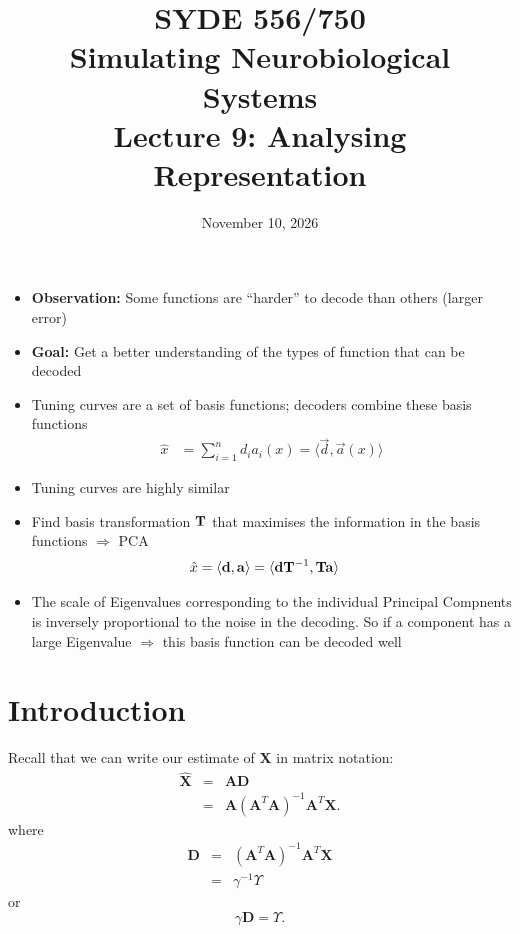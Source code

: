 \documentclass[10pt,letterpaper,oneside]{article}
\date{November 10, 2026}
\title{SYDE 556/750 \\ Simulating Neurobiological Systems \\ Lecture 9: Analysing Representation}
\begin{document}



\begin{itemize}
	\item \textbf{Observation:} Some functions are \enquote{harder} to decode than others (larger error)
	\item \textbf{Goal:} Get a better understanding of the types of function that can be decoded
	\item Tuning curves are a set of basis functions; decoders combine these basis functions
	\begin{align*}
		\hat x &= \sum_{i = 1}^n d_i a_i(x) = \langle \vec d, \vec a(x) \rangle
	\end{align*}
	\item Tuning curves are highly similar
	\item Find basis transformation ${\mathbf{T}}$ that maximises the information in the basis functions $\Rightarrow$ PCA
	\begin{align*}
		\hat x &= \langle {\mathbf{d}}, {\mathbf{a}} \rangle = \langle {\mathbf{d}} {\mathbf{T}}^{-1}, {\mathbf{T}} {\mathbf{a}} \rangle
	\end{align*}
	\item The scale of Eigenvalues corresponding to the individual Principal Compnents is inversely proportional to the noise in the decoding. So if a component has a large Eigenvalue $\Rightarrow$ this basis function can be decoded well
\end{itemize}

\section{Introduction}

Recall that we can write our estimate of $\mathbf{X}$ in matrix notation:
\begin{eqnarray*}
  \hat{\mathbf{X}} & = & \mathbf{A}\mathbf{D}\\
   & = & \mathbf{A}(\mathbf{A}^{T}\mathbf{A})^{-1}\mathbf{A}^{T}\mathbf{X}.
\end{eqnarray*}
where 
\begin{eqnarray*}
  \mathbf{D} & = & (\mathbf{A}^{T}\mathbf{A})^{-1}\mathbf{A}^{T}\mathbf{X}\\
    & = & \gamma^{-1}\Upsilon
\end{eqnarray*}
or
\begin{equation*}
  \gamma \mathbf{D}  =  \Upsilon.
\end{equation*}
\end{document}

